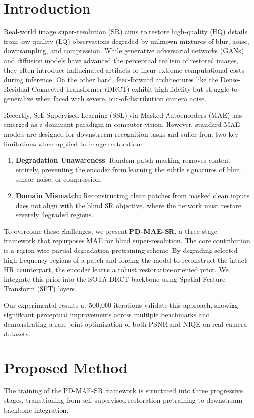 \documentclass[journal,10pt,doublecolumn]{IEEEtran}
\begin{document}
\section{Introduction}
Real-world image super-resolution (SR) aims to restore high-quality (HQ) details from low-quality (LQ) observations degraded by unknown mixtures of blur, noise, downsampling, and compression. While generative adversarial networks (GANs) and diffusion models have advanced the perceptual realism of restored images, they often introduce hallucinated artifacts or incur extreme computational costs during inference. On the other hand, feed-forward architectures like the Dense-Residual Connected Transformer (DRCT) \cite{hsu2024drct} exhibit high fidelity but struggle to generalize when faced with severe, out-of-distribution camera noise.

Recently, Self-Supervised Learning (SSL) via Masked Autoencoders (MAE) \cite{he2022masked} has emerged as a dominant paradigm in computer vision. However, standard MAE models are designed for downstream recognition tasks and suffer from two key limitations when applied to image restoration:
\begin{enumerate}
    \item \textbf{Degradation Unawareness:} Random patch masking removes content entirely, preventing the encoder from learning the subtle signatures of blur, sensor noise, or compression.
    \item \textbf{Domain Mismatch:} Reconstructing clean patches from masked clean inputs does not align with the blind SR objective, where the network must restore severely degraded regions.
\end{enumerate}

To overcome these challenges, we present \textbf{PD-MAE-SR}, a three-stage framework that repurposes MAE for blind super-resolution. The core contribution is a region-wise partial degradation pretraining scheme. By degrading selected high-frequency regions of a patch and forcing the model to reconstruct the intact HR counterpart, the encoder learns a robust restoration-oriented prior. We integrate this prior into the SOTA DRCT backbone using Spatial Feature Transform (SFT) layers. 

Our experimental results at 500,000 iterations validate this approach, showing significant perceptual improvements across multiple benchmarks and demonstrating a rare joint optimization of both PSNR and NIQE on real camera datasets.

\section{Proposed Method}
The training of the PD-MAE-SR framework is structured into three progressive stages, transitioning from self-supervised restoration pretraining to downstream backbone integration.
\end{document}
